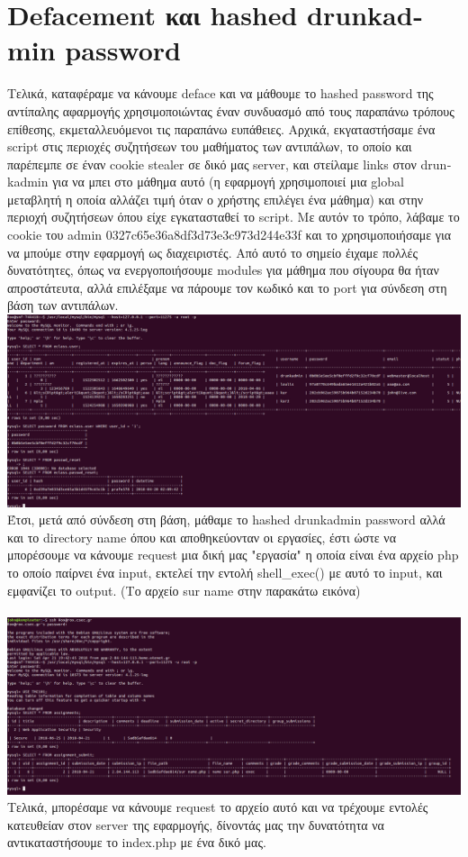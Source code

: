 \documentclass{article}
\begin{document}
\section*{\textlatin{Defacement} και \textlatin{hashed drunkadmin password}}
Τελικά, καταφέραμε να κάνουμε \textlatin{deface} και να μάθουμε το \textlatin{hashed password} της αντίπαλης αφαρμογής χρησιμοποιώντας έναν συνδυασμό από τους παραπάνω τρόπους επίθεσης, εκμεταλλευόμενοι τις παραπάνω ευπάθειες. Αρχικά, εκγαταστήσαμε ένα \textlatin{script} στις περιοχές συζητήσεων του μαθήματος των αντιπάλων, το οποίο και παρέπεμπε σε έναν \textlatin{cookie stealer} σε δικό μας server, και στείλαμε \textlatin{links} στον \textlatin{drunkadmin} για να μπει στο μάθημα αυτό (η εφαρμογή χρησιμοποιεί μια \textlatin{global} μεταβλητή η οποία αλλάζει τιμή όταν ο χρήστης επιλέγει ένα μάθημα) και στην περιοχή συζητήσεων όπου είχε εγκατασταθεί το \textlatin{script}. Με αυτόν το τρόπο, λάβαμε το \textlatin{cookie} του \textlatin{admin} \textlatin{0327c65e36a8df3d73e3c973d244e33f} και το χρησιμοποιήσαμε για να μπούμε στην εφαρμογή ως διαχειριστές. Από αυτό το σημείο έιχαμε πολλές δυνατότητες, όπως να ενεργοποιήσουμε \textlatin{modules} για μάθημα που σίγουρα θα ήταν απροστάτευτα, αλλά επιλέξαμε να πάρουμε τον κωδικό και το \textlatin{port} για σύνδεση στη βάση των αντιπάλων.\\
\includegraphics[scale=0.4]{term}\\ 
Έτσι, μετά από σύνδεση στη βάση, μάθαμε το \textlatin{hashed drunkadmin password} αλλά και το \textlatin{directory name} όπου και αποθηκεύονταν οι εργασίες, έστι ώστε να μπορέσουμε να κάνουμε \textlatin{request} μια δική μας "εργασία" η οποία είναι ένα αρχείο \textlatin{php} το οποίο παίρνει ένα \textlatin{input}, εκτελεί την εντολή \textlatin{shell\_exec()} με αυτό το \textlatin{input}, και εμφανίζει το \textlatin{output}. (Το αρχείο \textlatin{sur name} στην παρακάτω εικόνα)\\\\
\includegraphics[scale=0.4]{term2}\\

Τελικά, μπορέσαμε να κάνουμε \textlatin{request} το αρχείο αυτό και να τρέχουμε εντολές κατευθείαν στον \textlatin{server} της εφαρμογής, δίνοντάς μας την δυνατότητα να αντικαταστήσουμε το \textlatin{index.php} με ένα δικό μας.
\end{document}
